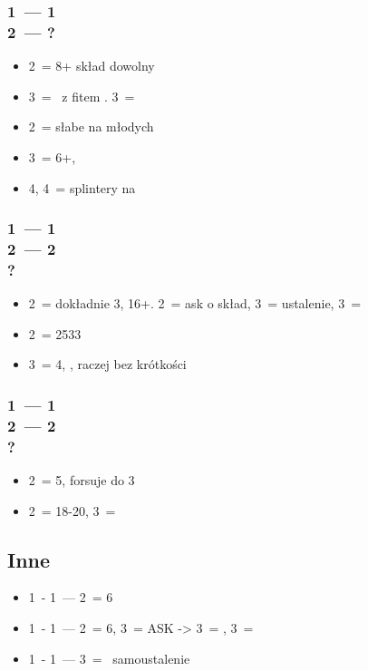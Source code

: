 \documentclass[12pt, a4paper]{article}
\begin{document}
\subsubsection*{1\hearts\ --- 1\spades \\ 2\clubs\ --- ?}
\begin{itemize}
    \item 2\diams\ = 8+ skład dowolny
    \item 3\hearts\ = \gf\ z fitem \hearts. 3\spades\ = \ns
    \item 2\nt\ = słabe na młodych
    \item 3\spades\ = 6+\spades, \inv
    \item 4\clubs, 4\diams\ = splintery na \hearts
\end{itemize}
\subsubsection*{1\hearts\ --- 1\spades \\ 2\clubs\ --- 2\diams \\ ?}
\begin{itemize}
    \item 2\spades\ = dokładnie 3\spades, 16+. 2\nt\ = ask o skład, 3\spades\ = ustalenie, 3\nt\ = \ns
    \item 2\nt\ = 2533
    \item 3\spades\ = 4\spades, \gf, raczej bez krótkości
\end{itemize}
\subsubsection*{1\hearts\ --- 1\spades \\ 2\clubs\ --- 2\hearts \\ ?}
\begin{itemize}
    \item 2\spades\ = 5\spades, forsuje do 3\major
    \item 2\nt\ = 18-20, 3\minor\ = \nf
\end{itemize}

\subsection*{Inne}
\begin{itemize}
    \item 1\hearts\ - 1\nt\ --- 2\spades\ = 6\spades
    \item 1\major\ - 1\nt\ --- 2\nt\ = 6\minor, 3\clubs\ = ASK -> 3\diams\ = \clubs, 3\hearts\ = \diams
    \item 1\major\ - 1\nt\ --- 3\major\ = \gf\ samoustalenie
\end{itemize}
\end{document}
